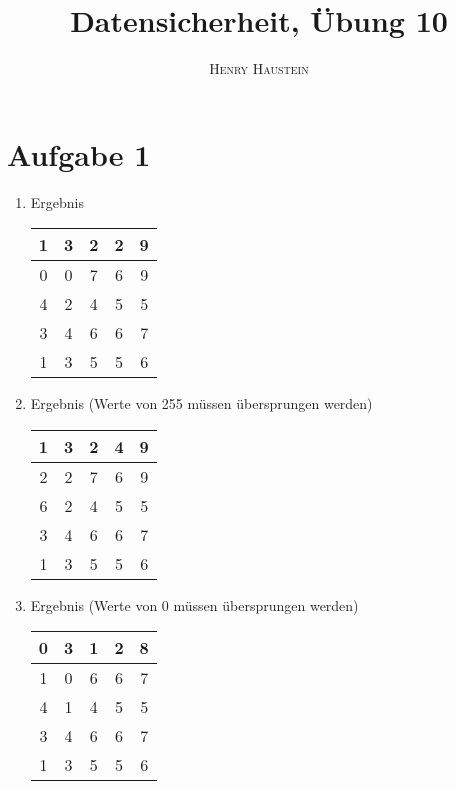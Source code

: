 \documentclass{article}
\title{\textbf{Datensicherheit, Übung 10}}
\author{\textsc{Henry Haustein}}
\date{}
\begin{document}
	\maketitle
	
	\section*{Aufgabe 1}
	\begin{enumerate}[label=(\alph*)]
		\item Ergebnis
		\begin{center}
			\begin{tabular}{|c|c|c|c|c|}
				\hline
				1 & 3 & 2 & 2 & 9 \\
				\hline
				0 & 0 & 7 & 6 & 9 \\
				\hline
				4 & 2 & 4 & 5 & 5 \\
				\hline
				3 & 4 & 6 & 6 & 7 \\
				\hline
				1 & 3 & 5 & 5 & 6 \\
				\hline
			\end{tabular}
		\end{center}
		\item Ergebnis (Werte von 255 müssen übersprungen werden)
		\begin{center}
			\begin{tabular}{|c|c|c|c|c|}
				\hline
				1 & 3 & 2 & 4 & 9 \\
				\hline
				2 & 2 & 7 & 6 & 9 \\
				\hline
				6 & 2 & 4 & 5 & 5 \\
				\hline
				3 & 4 & 6 & 6 & 7 \\
				\hline
				1 & 3 & 5 & 5 & 6 \\
				\hline
			\end{tabular}
		\end{center}
		\item Ergebnis (Werte von 0 müssen übersprungen werden)
		\begin{center}
			\begin{tabular}{|c|c|c|c|c|}
				\hline
				0 & 3 & 1 & 2 & 8 \\
				\hline
				1 & 0 & 6 & 6 & 7 \\
				\hline
				4 & 1 & 4 & 5 & 5 \\
				\hline
				3 & 4 & 6 & 6 & 7 \\
				\hline
				1 & 3 & 5 & 5 & 6 \\
				\hline
			\end{tabular}
		\end{center}
	\end{enumerate}
\end{document}
